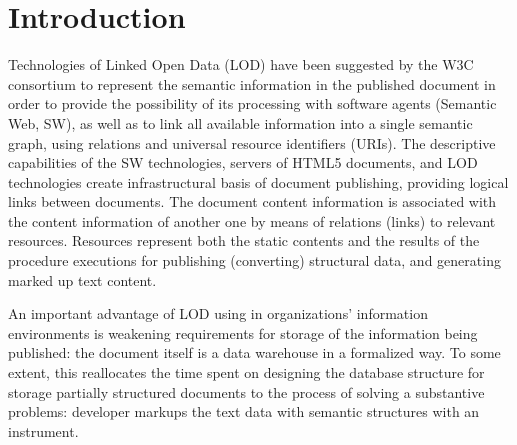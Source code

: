 \documentclass[conference,a4paper]{IEEEtran}
\begin{document}
\section{Introduction}




Technologies of Linked Open Data (LOD) \cite{b1} have been suggested by the W3C consortium to represent the semantic information in the published document in order to provide the possibility of its processing with software agents (Semantic Web, SW), as well as to link all available information into a single semantic graph, using relations and universal resource identifiers (URIs).  The descriptive capabilities of the SW technologies, servers of HTML5 documents, and LOD technologies create infrastructural basis of document publishing, providing logical links between documents.  The document content information is associated with the content information of another one by means of relations (links) to relevant resources.  Resources represent both the static contents and the results of the procedure executions for publishing (converting) structural data, and generating marked up text content.

An important advantage of LOD using in organizations' information environments is weakening requirements for storage of the information being published: the document itself is a data warehouse in a formalized way.  To some extent, this reallocates the time spent on designing the database structure for storage partially structured documents to the process of solving a substantive problems: developer markups the text data with semantic structures with an instrument.
\end{document}
